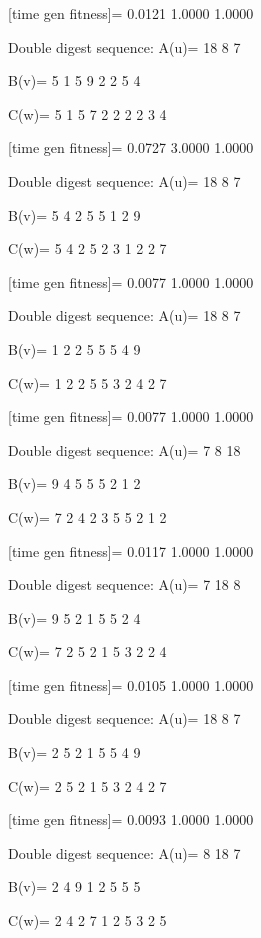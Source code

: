 [time gen fitness]=
    0.0121    1.0000    1.0000

Double digest sequence:
A(u)=
    18     8     7

B(v)=
     5     1     5     9     2     2     5     4

C(w)=
     5     1     5     7     2     2     2     2     3     4

[time gen fitness]=
    0.0727    3.0000    1.0000

Double digest sequence:
A(u)=
    18     8     7

B(v)=
     5     4     2     5     5     1     2     9

C(w)=
     5     4     2     5     2     3     1     2     2     7

[time gen fitness]=
    0.0077    1.0000    1.0000

Double digest sequence:
A(u)=
    18     8     7

B(v)=
     1     2     2     5     5     5     4     9

C(w)=
     1     2     2     5     5     3     2     4     2     7

[time gen fitness]=
    0.0077    1.0000    1.0000

Double digest sequence:
A(u)=
     7     8    18

B(v)=
     9     4     5     5     5     2     1     2

C(w)=
     7     2     4     2     3     5     5     2     1     2

[time gen fitness]=
    0.0117    1.0000    1.0000

Double digest sequence:
A(u)=
     7    18     8

B(v)=
     9     5     2     1     5     5     2     4

C(w)=
     7     2     5     2     1     5     3     2     2     4

[time gen fitness]=
    0.0105    1.0000    1.0000

Double digest sequence:
A(u)=
    18     8     7

B(v)=
     2     5     2     1     5     5     4     9

C(w)=
     2     5     2     1     5     3     2     4     2     7

[time gen fitness]=
    0.0093    1.0000    1.0000

Double digest sequence:
A(u)=
     8    18     7

B(v)=
     2     4     9     1     2     5     5     5

C(w)=
     2     4     2     7     1     2     5     3     2     5

